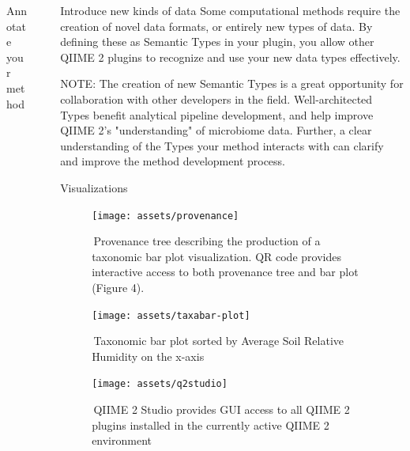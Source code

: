 \documentclass[final]{beamer}
\newlength{\sepwidth}
\newlength{\colwidth}
\newcommand{\separatorcolumn}{\begin{column}{\sepwidth}\end{column}}
\begin{document}
\begin{frame}[t]
\begin{columns}[t]
\begin{column}{\colwidth}
\begin{block}{Annotate your method}
\end{block}

\end{column}

\separatorcolumn

\begin{column}{\colwidth}

  \begin{block}{Introduce new kinds of data}
    Some computational methods require the creation of novel data formats, or
    entirely new types of data. By defining these as Semantic Types in your plugin,
    you allow other QIIME 2 plugins to recognize and use your new data types effectively.

    \begin{tcolorbox}
    [width=\textwidth, colframe=blue]
    {NOTE: The creation of new Semantic Types is a great opportunity for collaboration
    with other developers in the field. Well-architected Types benefit analytical pipeline
    development, and help improve QIIME 2's "understanding" of microbiome data. Further,
    a clear understanding of the Types your method interacts with can clarify and improve the method
    development process.}
    \end{tcolorbox}
  \end{block}

  \begin{block}{Visualizations}
    \begin{figure}[tph!]
      {\texttt{[image: assets/provenance]}}
      \caption{\,Provenance tree describing the production of a taxonomic bar plot visualization. QR code provides interactive access to both provenance tree and bar plot (Figure 4).}
      \label{fig:provenance}
    \end{figure}

    \begin{figure}[tph!]
      {\texttt{[image: assets/taxabar-plot]}}
      \caption{\,Taxonomic bar plot sorted by Average Soil Relative Humidity on the x-axis }
      \label{fig:taxabar-plot}
    \end{figure}

    \begin{figure}[tph!]
      {\texttt{[image: assets/q2studio]}}
      \caption{\,QIIME 2 Studio provides GUI access to all QIIME 2 plugins installed in the currently active QIIME 2 environment}
      \label{fig:q2studio}
    \end{figure}
  \end{block}


\end{column}
\end{columns}
\end{frame}
\end{document}
